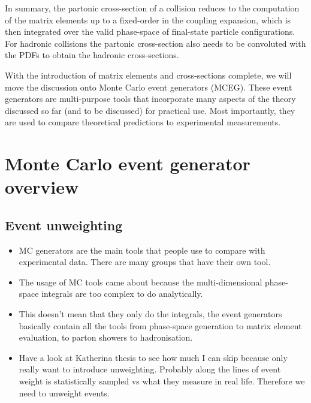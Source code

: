 \documentclass[main.tex]{subfiles}
\begin{document}
    In summary, the partonic cross-section of a collision
    reduces to the computation of the matrix elements
    up to a fixed-order in the coupling expansion,
    which is then integrated over the valid phase-space of
    final-state particle configurations. For hadronic
    collisions the partonic cross-section also needs to
    be convoluted with the PDFs to obtain the hadronic
    cross-sections.

    With the introduction of matrix elements and
    cross-sections complete, we will move the discussion onto
    Monte Carlo event generators (MCEG). These event
    generators are multi-purpose tools that
    incorporate many aspects of the theory discussed
    so far (and to be discussed) for practical use.
    Most importantly, they are
    used to compare theoretical predictions to
    experimental measurements.

\section{Monte Carlo event generator overview}
\subsection{Event unweighting}
\begin{itemize}
    \item MC generators are the main tools that
    people use to compare with experimental data.
    There are many groups that have their own tool.
    \item The usage of MC tools came about because
    the multi-dimensional phase-space integrals
    are too complex to do analytically.
    \item This doesn't mean that they only do
    the integrals, the event generators basically
    contain all the tools from phase-space generation
    to matrix element evaluation, to parton showers
    to hadronisation.
    \item Have a look at Katherina thesis to see
    how much I can skip because only really want to
    introduce unweighting. Probably along the lines
    of event weight is statistically sampled vs
    what they measure in real life. Therefore we need
    to unweight events.
\end{itemize}
\end{document}
